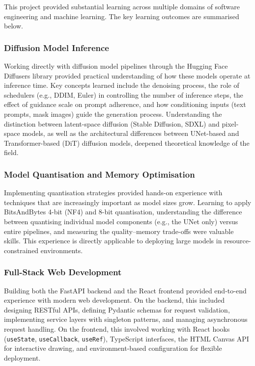 \documentclass[12pt,a4paper]{report}
\begin{document}
This project provided substantial learning across multiple domains of software engineering and machine learning. The key learning outcomes are summarised below.

\subsubsection{Diffusion Model Inference}

Working directly with diffusion model pipelines through the Hugging Face Diffusers library provided practical understanding of how these models operate at inference time. Key concepts learned include the denoising process, the role of schedulers (e.g., DDIM, Euler) in controlling the number of inference steps, the effect of guidance scale on prompt adherence, and how conditioning inputs (text prompts, mask images) guide the generation process. Understanding the distinction between latent-space diffusion (Stable Diffusion, SDXL) and pixel-space models, as well as the architectural differences between UNet-based and Transformer-based (DiT) diffusion models, deepened theoretical knowledge of the field.

\subsubsection{Model Quantisation and Memory Optimisation}

Implementing quantisation strategies provided hands-on experience with techniques that are increasingly important as model sizes grow. Learning to apply BitsAndBytes 4-bit (NF4) and 8-bit quantisation, understanding the difference between quantising individual model components (e.g., the UNet only) versus entire pipelines, and measuring the quality--memory trade-offs were valuable skills. This experience is directly applicable to deploying large models in resource-constrained environments.

\subsubsection{Full-Stack Web Development}

Building both the FastAPI backend and the React frontend provided end-to-end experience with modern web development. On the backend, this included designing RESTful APIs, defining Pydantic schemas for request validation, implementing service layers with singleton patterns, and managing asynchronous request handling. On the frontend, this involved working with React hooks (\texttt{useState}, \texttt{useCallback}, \texttt{useRef}), TypeScript interfaces, the HTML Canvas API for interactive drawing, and environment-based configuration for flexible deployment.
\end{document}
